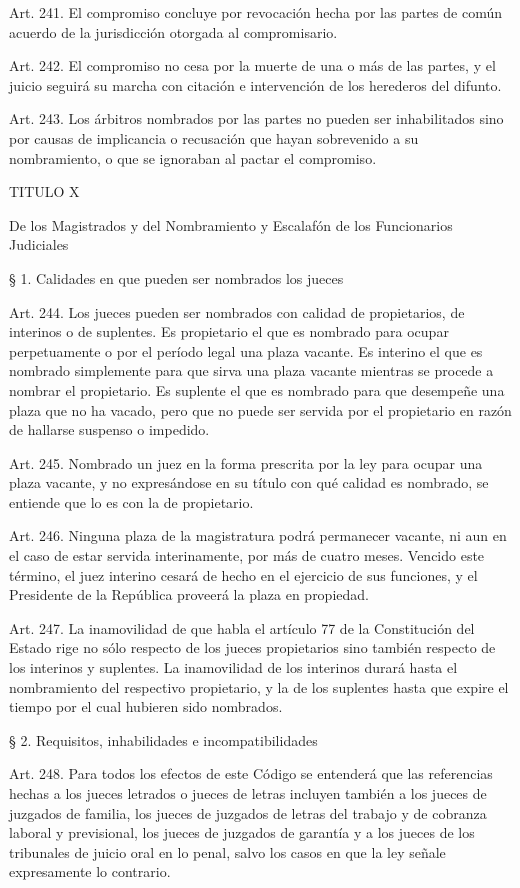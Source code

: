     Art. 241. El compromiso concluye por revocación hecha por las partes de común acuerdo de la jurisdicción otorgada al compromisario.

    Art. 242. El compromiso no cesa por la muerte de una o más de las partes, y el juicio seguirá su marcha con citación e intervención de los herederos del difunto.

    Art. 243. Los árbitros nombrados por las partes no pueden ser inhabilitados sino por causas de implicancia o recusación que hayan sobrevenido a su nombramiento, o que se ignoraban al pactar el compromiso.


    TITULO X

    De los Magistrados y del Nombramiento y Escalafón de los Funcionarios Judiciales


    § 1. Calidades en que pueden ser nombrados los jueces


    Art. 244. Los jueces pueden ser nombrados con calidad de propietarios, de interinos o de suplentes.
    Es propietario el que es nombrado para ocupar perpetuamente o por el período legal una plaza vacante.
    Es interino el que es nombrado simplemente para que sirva una plaza vacante mientras se procede a nombrar el propietario.
    Es suplente el que es nombrado para que desempeñe una plaza que no ha vacado, pero que no puede ser servida por el propietario en razón de hallarse suspenso o impedido.


    Art. 245. Nombrado un juez en la forma prescrita por la ley para ocupar una plaza vacante, y no expresándose en su título con qué calidad es nombrado, se entiende que lo es con la de propietario.

    Art. 246. Ninguna plaza de la magistratura podrá permanecer vacante, ni aun en el caso de estar servida interinamente, por más de cuatro meses. Vencido este término, el juez interino cesará de hecho en el ejercicio de sus funciones, y el Presidente de la República proveerá la plaza en propiedad.

    Art. 247. La inamovilidad de que habla el artículo 77 de la Constitución del Estado rige no sólo respecto de los jueces propietarios sino también respecto de los interinos y suplentes. La inamovilidad de los interinos durará hasta el nombramiento del respectivo propietario, y la de los suplentes hasta que expire el tiempo por el cual hubieren sido nombrados.


    § 2. Requisitos, inhabilidades e incompatibilidades

    Art. 248. Para todos los efectos de este Código se entenderá que las referencias hechas a los jueces letrados o jueces de letras incluyen también a los jueces de juzgados de familia, los jueces de juzgados de letras del trabajo y de cobranza laboral y previsional, los jueces de juzgados de garantía y a los jueces de los tribunales de juicio oral en lo penal, salvo los casos en que la ley señale expresamente lo contrario.




